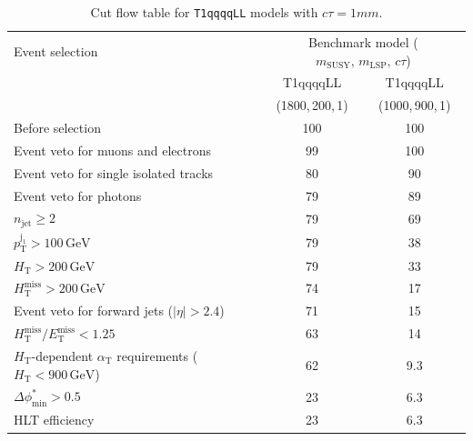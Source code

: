 \begin{table}[!h]
  \caption{Cut flow table for \texttt{T1qqqqLL} models with $c\tau = 1\unit{mm}$.} 
  \label{tab:cut_flow_ctau_1}
{\scriptsize%
\centering
\begin{tabular}{lcc}
  \hline
  Event selection & \multicolumn{2}{c}{Benchmark model ($m_\mathrm{SUSY},\,m_\mathrm{LSP},\,c\tau$)} \\
  \cline{2-3}
   & T1qqqqLL & T1qqqqLL \\
    & (1800,\,200,\,1) & (1000,\,900,\,1) \\
  \hline
  Before selection  & 100\phantom{.1} & 100\phantom{.1} \\
  Event veto for muons and electrons & \phantom{1}99\phantom{.1} & 100\phantom{.1} \\
  Event veto for single isolated tracks & \phantom{1}80\phantom{.1} & \phantom{1}90\phantom{.1} \\
  Event veto for photons & \phantom{1}79\phantom{.1} & \phantom{1}89\phantom{.1} \\
   $n_{\mathrm{jet}} \geq 2$  & \phantom{1}79\phantom{.1} & \phantom{1}69\phantom{.1} \\
   $p_{\mathrm{T}}^{\mathrm{j_1}} > 100\,\mathrm{GeV}$ & \phantom{1}79\phantom{.1} & \phantom{1}38\phantom{.1} \\
   $H_{\mathrm{T}} > 200\,\mathrm{GeV}$  & \phantom{1}79\phantom{.1} & \phantom{1}33\phantom{.1} \\
  $H_{\mathrm{T}}^{\mathrm{miss}} > 200\,\mathrm{GeV}$  & \phantom{1}74\phantom{.1} & \phantom{1}17\phantom{.1} \\
  Event veto for forward jets ($|\eta| > 2.4$) & \phantom{1}71\phantom{.1} & \phantom{1}15\phantom{.1} \\
  $H_{\mathrm{T}}^{\mathrm{miss}} / E_{\mathrm{T}}^{\mathrm{miss}} < 1.25$ & \phantom{1}63\phantom{.1} & \phantom{1}14\phantom{.1} \\
  $H_{\mathrm{T}}$-dependent $\alpha_{\mathrm{T}}$ requirements ($H_{\mathrm{T}} < 900\,\mathrm{GeV}$)  & \phantom{1}62\phantom{.1} & \phantom{10}9.3 \\
  $\Delta\phi^{*}_{\mathrm{min}} > 0.5$  & \phantom{1}23\phantom{.1} & \phantom{10}6.3 \\
  \hline
  HLT efficiency & \phantom{1}23\phantom{.1} & \phantom{10}6.3  \\
  \hline
\end{tabular}
}
\end{table}

